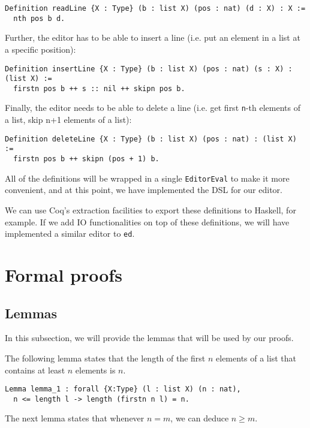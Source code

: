 \documentclass{article}
\theoremstyle{definition}
\begin{document}
\begin{lstlisting}
Definition readLine {X : Type} (b : list X) (pos : nat) (d : X) : X :=
  nth pos b d.
\end{lstlisting}

Further, the editor has to be able to insert a line (i.e. put an element in a list at a specific position):

\begin{lstlisting}
Definition insertLine {X : Type} (b : list X) (pos : nat) (s : X) : (list X) :=
  firstn pos b ++ s :: nil ++ skipn pos b.
\end{lstlisting}

Finally, the editor needs to be able to delete a line (i.e. get first \texttt{n}-th elements of a list, skip n+1 elements of a list):

\begin{lstlisting}
Definition deleteLine {X : Type} (b : list X) (pos : nat) : (list X) :=
  firstn pos b ++ skipn (pos + 1) b.
\end{lstlisting}

All of the definitions will be wrapped in a single \texttt{EditorEval} to make it more convenient, and at this point, we have implemented the DSL for our editor.

We can use Coq's extraction facilities to export these definitions to Haskell, for example. If we add IO functionalities on top of these definitions, we will have implemented a similar editor to \texttt{ed}.

\section{Formal proofs}

\subsection{Lemmas}

In this subsection, we will provide the lemmas that will be used by our proofs.

The following lemma states that the length of the first \(n\) elements of a list that contains at least \(n\) elements is \(n\).

\begin{lstlisting}
Lemma lemma_1 : forall {X:Type} (l : list X) (n : nat),
  n <= length l -> length (firstn n l) = n.
\end{lstlisting}

The next lemma states that whenever \(n = m\), we can deduce \(n \geq m\).
\end{document}
